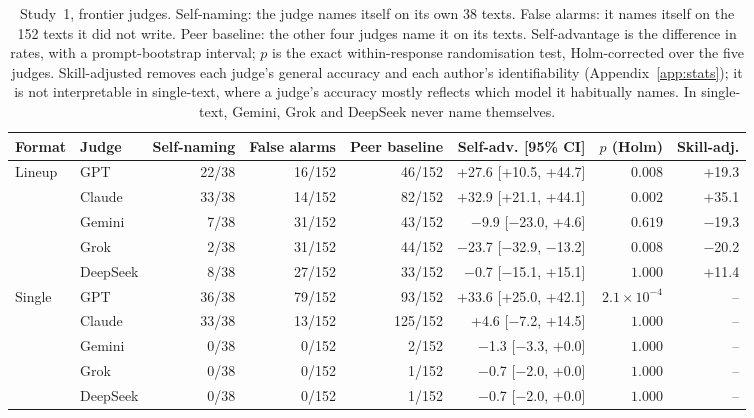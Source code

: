 \begin{table}[t]
\centering\small\setlength\tabcolsep{3.5pt}
\begin{tabular}{llrrrrrr}
\toprule
Format & Judge & Self-naming & False alarms & Peer baseline & Self-adv. [95\% CI] & $p$ (Holm) & Skill-adj. \\
\midrule
Lineup & GPT & 22/38 & 16/152 & 46/152 & +27.6 [+10.5, +44.7] & $0.008$ & +19.3 \\
 & Claude & 33/38 & 14/152 & 82/152 & +32.9 [+21.1, +44.1] & $0.002$ & +35.1 \\
 & Gemini & 7/38 & 31/152 & 43/152 & $-$9.9 [$-$23.0, +4.6] & $0.619$ & $-$19.3 \\
 & Grok & 2/38 & 31/152 & 44/152 & $-$23.7 [$-$32.9, $-$13.2] & $0.008$ & $-$20.2 \\
 & DeepSeek & 8/38 & 27/152 & 33/152 & $-$0.7 [$-$15.1, +15.1] & $1.000$ & +11.4 \\
\midrule
Single & GPT & 36/38 & 79/152 & 93/152 & +33.6 [+25.0, +42.1] & $2.1\times10^{-4}$ & -- \\
 & Claude & 33/38 & 13/152 & 125/152 & +4.6 [$-$7.2, +14.5] & $1.000$ & -- \\
 & Gemini & 0/38 & 0/152 & 2/152 & $-$1.3 [$-$3.3, +0.0] & $1.000$ & -- \\
 & Grok & 0/38 & 0/152 & 1/152 & $-$0.7 [$-$2.0, +0.0] & $1.000$ & -- \\
 & DeepSeek & 0/38 & 0/152 & 1/152 & $-$0.7 [$-$2.0, +0.0] & $1.000$ & -- \\
\bottomrule
\end{tabular}
\caption{Study~1, frontier judges. Self-naming: the judge names itself on its own 38 texts. False alarms: it names itself on the 152 texts it did not write. Peer baseline: the other four judges name it on its texts. Self-advantage is the difference in rates, with a prompt-bootstrap interval; $p$ is the exact within-response randomisation test, Holm-corrected over the five judges. Skill-adjusted removes each judge's general accuracy and each author's identifiability (Appendix~\ref{app:stats}); it is not interpretable in single-text, where a judge's accuracy mostly reflects which model it habitually names. In single-text, Gemini, Grok and DeepSeek never name themselves.}
\label{tab:frontier}
\end{table}
